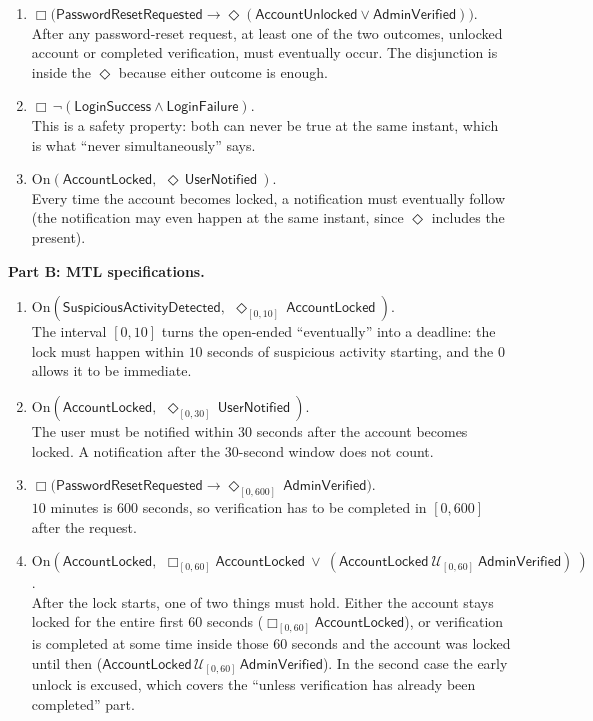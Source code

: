 \documentclass[a4paper, 11pt]{article}
\newcommand{\ap}[1]{\mathsf{#1}}
\newcommand{\LF}{\ap{LoginFailure}}
\newcommand{\LS}{\ap{LoginSuccess}}
\newcommand{\AL}{\ap{AccountLocked}}
\newcommand{\AU}{\ap{AccountUnlocked}}
\newcommand{\AV}{\ap{AdminVerified}}
\newcommand{\PR}{\ap{PasswordResetRequested}}
\newcommand{\UN}{\ap{UserNotified}}
\newcommand{\SA}{\ap{SuspiciousActivityDetected}}
\newcommand{\G}{\Box}
\newcommand{\F}{\Diamond}
\newcommand{\On}[2]{\mathrm{On}(#1,\,#2)}
\begin{document}
\begin{solution}
\begin{enumerate}
    \item $\G\big(\PR \to \F(\AU \vee \AV)\big)$. \\
    After any password-reset request, at least one of the two outcomes, unlocked account or completed verification, must eventually occur. The disjunction is inside the $\F$ because either outcome is enough.

    \item $\G\,\neg(\LS \wedge \LF)$. \\
    This is a safety property: both can never be true at the same instant, which is what ``never simultaneously'' says.

    \item $\On{\AL}{\ \F\,\UN\ }$. \\
    Every time the account becomes locked, a notification must eventually follow (the notification may even happen at the same instant, since $\F$ includes the present).
\end{enumerate}

\bigskip
\noindent\textbf{Part B: MTL specifications.}
\begin{enumerate}
    \item $\On{\SA}{\ \F_{[0,10]}\,\AL\ }$. \\
    The interval $[0,10]$ turns the open-ended ``eventually'' into a deadline: the lock must happen within $10$ seconds of suspicious activity starting, and the $0$ allows it to be immediate.

    \item $\On{\AL}{\ \F_{[0,30]}\,\UN\ }$. \\
    The user must be notified within $30$ seconds after the account becomes locked. A notification after the $30$-second window does not count.

    \item $\G\big(\PR \to \F_{[0,600]}\,\AV\big)$. \\
    $10$ minutes is $600$ seconds, so verification has to be completed in $[0,600]$ after the request.

    \item $\On{\AL}{\ \G_{[0,60]}\AL\ \vee\ (\AL\ \mathcal{U}_{[0,60]}\ \AV)\ }$. \\
    After the lock starts, one of two things must hold. Either the account stays locked for the entire first $60$ seconds ($\G_{[0,60]}\AL$), or verification is completed at some time inside those $60$ seconds and the account was locked until then ($\AL\,\mathcal{U}_{[0,60]}\,\AV$). In the second case the early unlock is excused, which covers the ``unless verification has already been completed'' part.


\end{enumerate}
\end{solution}
\end{document}
